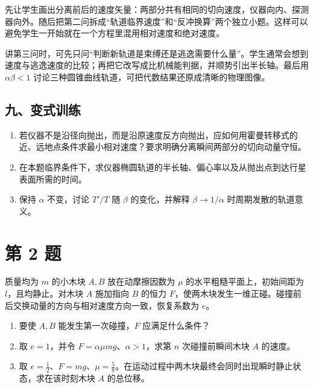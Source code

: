 \documentclass[12pt,a4paper,UTF8]{ctexart}
\newcommand{\tightlist}{\setlength{\itemsep}{0pt}\setlength{\parskip}{0pt}}
\begin{document}
先让学生画出分离前后的速度矢量：两部分共有相同的切向速度，仪器向内、探测器向外。随后把第二问拆成``轨道临界速度''和``反冲换算''两个独立小题。这样可以避免学生一开始就在一个方程里混用相对速度和绝对速度。

讲第三问时，可先只问``判断新轨道是束缚还是逃逸需要什么量''。学生通常会想到速度与逃逸速度的比较；再把它改写成比机械能判据，并顺势引出半长轴。最后用
\(\alpha\beta<1\)
讨论三种圆锥曲线轨道，可把代数结果还原成清晰的物理图像。

\subsection{九、变式训练}\label{ux4e5dux53d8ux5f0fux8badux7ec3}

\begin{enumerate}
\def\labelenumi{\arabic{enumi}.}
\tightlist
\item
  若仪器不是沿径向抛出，而是沿原速度反方向抛出，应如何用霍曼转移式的近、远地点条件求最小相对速度？要求明确分离瞬间两部分的切向动量守恒。
\item
  在本题临界条件下，求仪器椭圆轨道的半长轴、偏心率以及从抛出点到达行星表面所需的时间。
\item
  保持 \(\alpha\) 不变，讨论 \(T'/T\) 随 \(\beta\) 的变化，并解释
  \(\beta\to1/\alpha\) 时周期发散的轨道意义。
\end{enumerate}

\newpage

\section{第 2 题}\label{ux7b2c-2-ux9898}

质量均为 \(m\) 的小木块 \(A,B\) 放在动摩擦因数为 \(\mu\)
的水平粗糙平面上，初始间距为 \(l\)，且均静止。对木块 \(A\) 施加指向
\(B\) 的恒力
\(F\)，使两木块发生一维正碰。碰撞前后交换动量的方向与相对速度方向一致，恢复系数为
\(e\)。

\begin{enumerate}
\def\labelenumi{\arabic{enumi}.}
\tightlist
\item
  要使 \(A,B\) 能发生第一次碰撞，\(F\) 应满足什么条件？
\item
  取 \(e=1\)，并令 \(F=\alpha\mu mg\)、\(\alpha>1\)，求第 \(n\)
  次碰撞前瞬间木块 \(A\) 的速度。
\item
  取
  \(e=\tfrac12\)、\(F=mg\)、\(\mu=\tfrac58\)。在运动过程中两木块最终会同时出现瞬时静止状态，求在该时刻木块
  \(A\) 的总位移。
\end{enumerate}
\end{document}
